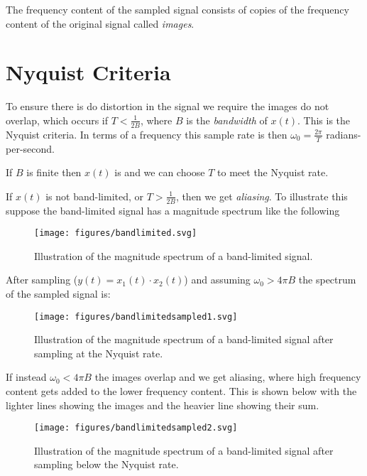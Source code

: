 \documentclass{article}
\begin{document}
The frequency content of the sampled signal consists of copies of the frequency content of the original signal called \textit{images}.

\section{Nyquist Criteria}

To ensure there is do distortion in the signal we require the images do not overlap, which occurs if $T < \frac{1}{2B}$, where $B$ is the \textit{bandwidth} of $x(t)$. This is the Nyquist criteria. In terms of a frequency this sample rate is then $\omega_0 = \tfrac{2\pi}{T}$ radians-per-second.

If $B$ is finite then $x(t)$ is  and we can choose $T$ to meet the Nyquist rate.

If $x(t)$ is not band-limited, or $T > \frac{1}{2B}$, then we get \textit{aliasing}. To illustrate this suppose the band-limited signal has a magnitude spectrum like the following

\begin{figure}
  \centering
  \texttt{[image: figures/bandlimited.svg]}
  \caption{Illustration of the magnitude spectrum of a band-limited signal.}
\end{figure}

After sampling ($y(t) = x_1(t)\cdot x_2(t)$) and assuming $\omega_0 > 4\pi B$ the spectrum of the sampled signal is:

\begin{figure}
  \centering
  \texttt{[image: figures/bandlimitedsampled1.svg]}
  \caption{Illustration of the magnitude spectrum of a band-limited signal after sampling at the Nyquist rate.}
\end{figure}

If instead $\omega_0 < 4\pi B$ the images overlap and we get aliasing, where high frequency content gets added to the lower frequency content. This is shown below with the lighter lines showing the images and the heavier line showing their sum.

\begin{figure}
  \centering
  \texttt{[image: figures/bandlimitedsampled2.svg]}
  \caption{Illustration of the magnitude spectrum of a band-limited signal after sampling below the Nyquist rate.}
\end{figure}
\end{document}
